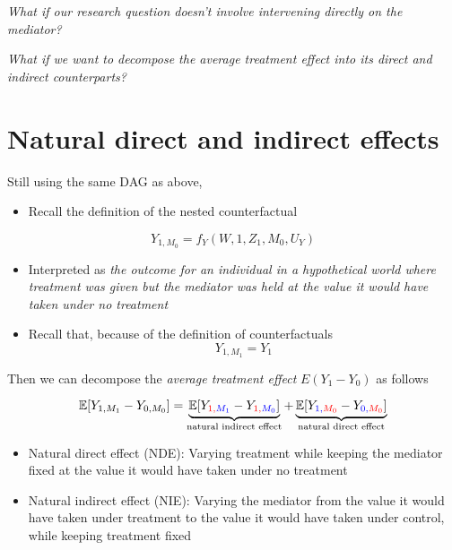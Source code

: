 \documentclass[
  12pt,
]{book}
\providecommand{\tightlist}{%
  \setlength{\itemsep}{0pt}\setlength{\parskip}{0pt}}
\theoremstyle{definition}
\theoremstyle{definition}
\theoremstyle{definition}
\newcommand{\E}{\mathbb{E}}
\newcommand{\1}{\mathbbm{1}}
\begin{document}
\emph{What if our research question doesn't involve intervening directly on the
mediator?}

\emph{What if we want to decompose the average treatment effect into its direct and
indirect counterparts?}

\hypertarget{natural-direct-and-indirect-effects}{%
\section{Natural direct and indirect effects}\label{natural-direct-and-indirect-effects}}

Still using the same DAG as above,

\begin{itemize}
\tightlist
\item
  Recall the definition of the nested counterfactual
\end{itemize}

\begin{equation*}
    Y_{1, M_0} = f_Y(W, 1, Z_1, M_0, U_Y)
\end{equation*}

\begin{itemize}
\item
  Interpreted as \emph{the outcome for an individual in a hypothetical world where
  treatment was given but the mediator was held at the value it would have
  taken under no treatment}
\item
  Recall that, because of the definition of counterfactuals
  \begin{equation*}
  Y_{1, M_1} = Y_1
  \end{equation*}
\end{itemize}

Then we can decompose the \emph{average treatment effect} \(E(Y_1-Y_0)\) as follows

\begin{equation*}
\E[Y_{1,M_1} - Y_{0,M_0}] = \underbrace{\E[Y_{\color{red}{1},\color{blue}{M_1}} -
    Y_{\color{red}{1},\color{blue}{M_0}}]}_{\text{natural indirect effect}} +
    \underbrace{\E[Y_{\color{blue}{1},\color{red}{M_0}} -
    Y_{\color{blue}{0},\color{red}{M_0}}]}_{\text{natural direct effect}}
\end{equation*}

\begin{itemize}
\tightlist
\item
  Natural direct effect (NDE): Varying treatment while keeping the mediator
  fixed at the value it would have taken under no treatment
\item
  Natural indirect effect (NIE): Varying the mediator from the value it would
  have taken under treatment to the value it would have taken under control,
  while keeping treatment fixed
\end{itemize}
\end{document}
